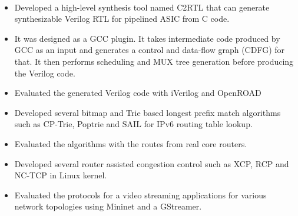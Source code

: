 \documentclass[10pt,a4paper,ragged2e]{altacv}
\begin{document}
\\







\begin{itemize}
	\item Developed a high-level synthesis tool named C2RTL that can generate synthesizable Verilog RTL for pipelined ASIC from C code.
	\item It was designed as a GCC plugin. It takes intermediate code produced by GCC as an input and generates a control and data-flow graph (CDFG) for that. It then performs scheduling and MUX tree generation before producing the Verilog code.
	\item Evaluated the generated Verilog code with iVerilog and OpenROAD 
\end{itemize}
\smallskip
{}
\begin{itemize}
	\item Developed several bitmap and Trie based longest prefix match algorithms such as CP-Trie, Poptrie and SAIL for IPv6 routing table lookup. 
	\item Evaluated the algorithms with the routes from real core routers.
\end{itemize}
\smallskip
{}
\begin{itemize}
	\item Developed several router assisted congestion control such as XCP, RCP and NC-TCP  in Linux kernel.
	\item Evaluated the protocols for a video streaming applications for various network topologies using Mininet and a GStreamer. 
\end{itemize}
\end{document}
